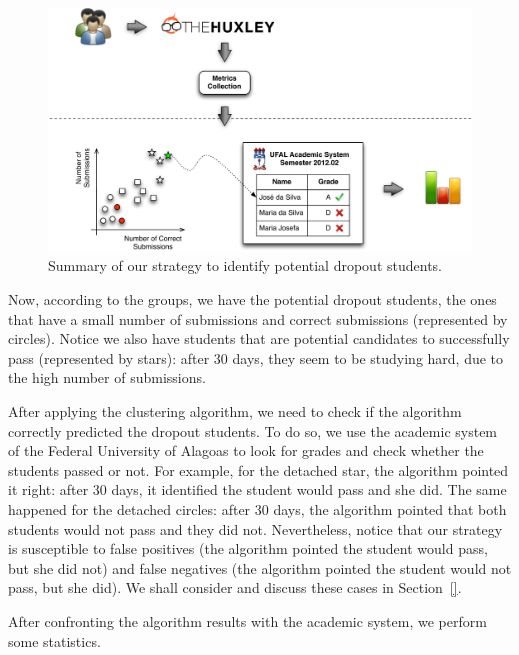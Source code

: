 \begin{figure}[htb]
\centering
\includegraphics[width=1.0\textwidth]{images/Strategy.pdf}
\caption{Summary of our strategy to identify potential dropout students.}
\label{fig:strategy}
\end{figure}

Now, according to the groups, we have the potential dropout students, the ones that have a small number of submissions and correct submissions (represented by circles). Notice we also have students that are potential candidates to successfully pass (represented by stars): after 30 days, they seem to be studying hard, due to the high number of submissions.

After applying the clustering algorithm, we need to check if the algorithm correctly predicted the dropout students. To do so, we use the academic system of the Federal University of Alagoas to look for grades and check whether the students passed or not. For example, for the detached star, the algorithm pointed it right: after 30 days, it identified the student would pass and she did. The same happened for the detached circles: after 30 days, the algorithm pointed that both students would not pass and they did not. Nevertheless, notice that our strategy is susceptible to false positives (the algorithm pointed the student would pass, but she did not) and false negatives (the algorithm pointed the student would not pass, but she did). We shall consider and discuss these cases in Section~\ref{}.

After confronting the algorithm results with the academic system, we perform some statistics.

